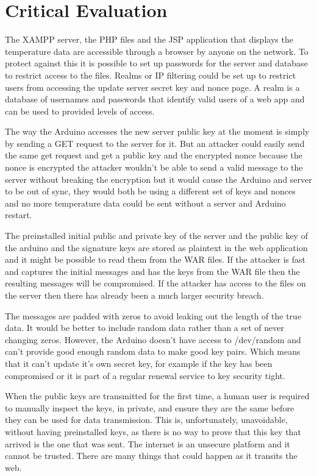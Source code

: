 \chapter{Critical Evaluation}
\label{crit}



The XAMPP server, the PHP files and the JSP application that displays the temperature data are accessible through a browser by anyone on the network. To protect against this it is possible to set up passwords for the server and database to restrict access to the files. Realms or IP filtering could be set up to restrict users from accessing the update server secret key and nonce page. A realm is a database of usernames and passwords that identify valid users of a web app and can be used to provided levels of access.

The way the Arduino accesses the new server public key at the moment is simply by sending a GET request to the server for it. But an attacker could easily send the same get request and get a public key and the encrypted nonce because the nonce is encrypted the attacker wouldn't be able to send a valid message to the server without breaking the encryption but it would cause the Arduino and server to be out of sync, they would both be using a different set of keys and nonces and no more temperature data could be sent without a server and Arduino restart.

The preinstalled initial public and private key of the server and the public key of the arduino and the signature keys are stored as plaintext in the web application and it might be possible to read them from the WAR files. If the attacker is fast and captures the initial messages and has the keys from the WAR file then the resulting messages will be compromised. If the attacker has access to the files on the server then there has already been a much larger security breach.

The messages are padded with zeros to avoid leaking out the length of the true data. It would be better to include random data rather than a set of never changing zeros. However, the Arduino doesn't have access to /dev/random and can't provide good enough random data to make good key pairs. Which means that it can't update it's own secret key, for example if the key has been compromised or it is part of a regular renewal service to key security tight.

When the public keys are transmitted for the first time, a human user is required to manually inspect the keys, in private, and ensure they are the same before they can be used for data transmission. This is, unfortunately, unavoidable, without having preinstalled keys, as there is no way to prove that this key that arrived is the one that was sent. The internet is an unsecure platform and it cannot be trusted. There are many things that could happen as it transits the web. 

